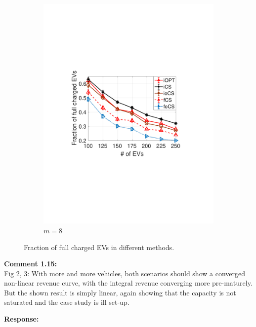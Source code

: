 \documentclass[11pt]{article}
\begin{document}
\begin{figure}[t]
\begin{subfigure}[b]{0.3\textwidth}
\begin{center}
						\includegraphics[width=\textwidth]{acc-M8.pdf}
						\caption{$m=8$}
						\label{fig:acc-M8}
					\end{center}
				\end{subfigure}%
				\caption{Fraction of full charged EVs in different methods.} 
				\label{fig:acc}
				\vspace{-3mm}
			\end{figure}

 

\vspace{5mm}
{
{\color{blue}\noindent\textbf{Comment 1.15:}\\
Fig 2, 3: With more and more vehicles, both scenarios should show a converged non-linear revenue curve, with the integral revenue converging more pre-maturely. But the shown result is simply linear, again showing that the capacity is not saturated and the case study is ill set-up.
}}

\vspace{5mm}
\noindent\textbf{Response:}
\end{document}
